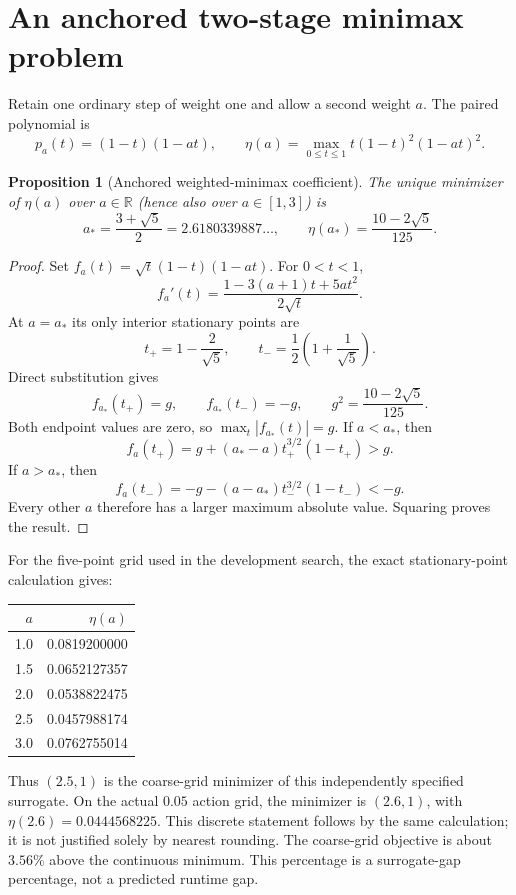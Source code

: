 \documentclass[11pt]{article}
\newtheorem{proposition}{Proposition}
\newcommand{\R}{\mathbb R}
\begin{document}
\section{An anchored two-stage minimax problem}
Retain one ordinary step of weight one and allow a second weight $a$.
The paired polynomial is
\[
 p_a(t)=(1-t)(1-at),\qquad
 \eta(a)=\max_{0\le t\le1}t(1-t)^2(1-at)^2.
\]

\begin{proposition}[Anchored weighted-minimax coefficient]
The unique minimizer of $\eta(a)$ over $a\in\R$ (hence also over
$a\in[1,3]$) is
\[
 a_*=\frac{3+\sqrt5}{2}=2.6180339887\ldots,
 \qquad
 \eta(a_*)=\frac{10-2\sqrt5}{125}.
\]
\end{proposition}
\begin{proof}
Set $f_a(t)=\sqrt t(1-t)(1-at)$. For $0<t<1$,
\[
 f_a'(t)=\frac{1-3(a+1)t+5at^2}{2\sqrt t}.
\]
At $a=a_*$ its only interior stationary points are
\[
 t_+=1-\frac2{\sqrt5},\qquad
 t_-=\frac12\left(1+\frac1{\sqrt5}\right).
\]
Direct substitution gives
\[
 f_{a_*}(t_+)=g,\qquad f_{a_*}(t_-)=-g,\qquad
 g^2=\frac{10-2\sqrt5}{125}.
\]
Both endpoint values are zero, so $\max_t|f_{a_*}(t)|=g$.
If $a<a_*$, then
\[
 f_a(t_+)=g+(a_*-a)t_+^{3/2}(1-t_+)>g.
\]
If $a>a_*$, then
\[
 f_a(t_-)=-g-(a-a_*)t_-^{3/2}(1-t_-)<-g.
\]
Every other $a$ therefore has a larger maximum absolute value. Squaring
proves the result.
\end{proof}

For the five-point grid used in the development search, the exact
stationary-point calculation gives:
\begin{center}
\begin{tabular}{rr}
\toprule
$a$ & $\eta(a)$\\
\midrule
1.0 & 0.0819200000\\
1.5 & 0.0652127357\\
2.0 & 0.0538822475\\
2.5 & 0.0457988174\\
3.0 & 0.0762755014\\
\bottomrule
\end{tabular}
\end{center}
Thus $(2.5,1)$ is the coarse-grid minimizer of this independently specified
surrogate. On the actual $0.05$ action grid, the minimizer is $(2.6,1)$,
with $\eta(2.6)=0.0444568225$. This discrete statement follows by the
same calculation; it is not justified solely by nearest rounding.
The coarse-grid objective is about $3.56\%$ above the continuous minimum.
This percentage is a surrogate-gap percentage, not a predicted runtime gap.
\end{document}
